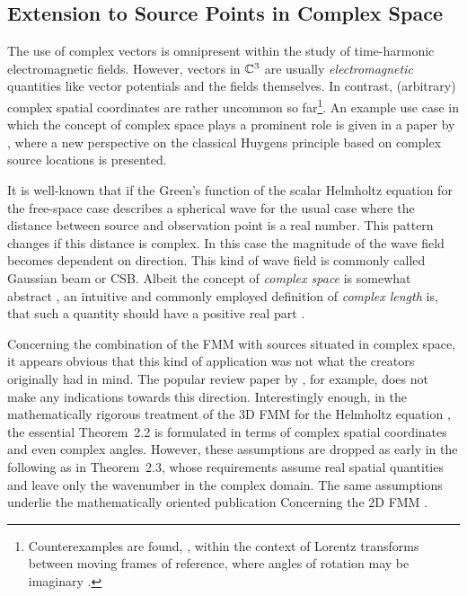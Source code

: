 \subsection{Extension to Source Points in Complex Space}

The use of complex vectors \cite[Chapter 1]{Lindell2000} is omnipresent within
the study of time-harmonic electromagnetic fields.
However, vectors in $\mathbb{C}^3$ are usually \emph{electromagnetic} quantities like
vector potentials and the fields themselves.
In contrast, (arbitrary) complex spatial coordinates are rather uncommon so
far\footnote{Counterexamples are found, \eg, within the context of Lorentz
transforms between moving frames of reference, where angles of rotation may be
imaginary \cite[Chapter~11]{Jackson2013}.}.
An example use case in which the concept of complex space plays a prominent role
is given in a paper by \textcite{Hansen2009}, where a new perspective on the
classical Huygens principle based on complex source locations is presented. 

It is well-known that if the Green's function of the scalar Helmholtz equation
for the free-space case describes a spherical wave for the usual case where
the distance between source and observation point is a real number.
This pattern changes if this distance is complex.
In this case the magnitude of the wave field becomes dependent on direction.
This kind of wave field is commonly called Gaussian beam or \ac{CSB}.
Albeit the concept of \emph{complex space} is somewhat abstract
\cite[Chapter~1]{Lindell2000}, an intuitive and commonly employed definition of
\emph{complex length} is, that such a quantity should have a positive real part
\cite{Hansen2009, Hansen2013}.

Concerning the combination of the \ac{FMM} with sources situated in complex
space, it appears obvious that this kind of application was not what the
creators originally had in mind.
The popular review paper by \textcite{Coifman1993}, for example, does not make
any indications towards this direction.
Interestingly enough, in the mathematically rigorous treatment of the 3D
\ac{FMM} for the Helmholtz equation \cite{Rokhlin1993}, the essential
Theorem~2.2 is formulated in terms of complex spatial coordinates and even
complex angles.
However, these assumptions are dropped as early in the following as in
Theorem~2.3, whose requirements assume real spatial quantities and leave only
the wavenumber in the complex domain.
The same assumptions underlie the mathematically oriented publication Concerning
the 2D \ac{FMM} \cite{Rokhlin1990}.

